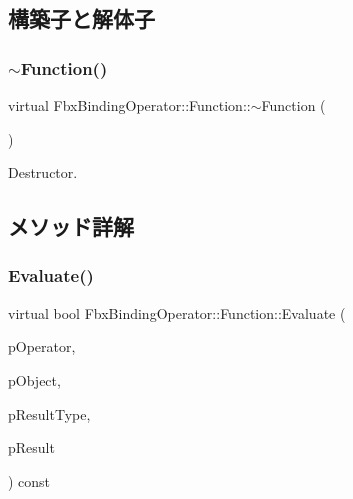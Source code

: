 \subsection{構築子と解体子}
\mbox{\label{class_fbx_binding_operator_1_1_function_a87c75b7d2a19945c11161104691294c9}} 
\subsubsection{\texorpdfstring{$\sim$\+Function()}{~Function()}}
{\footnotesize\ttfamily virtual Fbx\+Binding\+Operator\+::\+Function\+::$\sim$\+Function (\begin{DoxyParamCaption}{ }\end{DoxyParamCaption})\hspace{0.3cm}{\ttfamily [virtual]}}



Destructor. 



\subsection{メソッド詳解}
\mbox{\label{class_fbx_binding_operator_1_1_function_aa238a63d12508db3cb5c00a4b157524e}} 
\subsubsection{\texorpdfstring{Evaluate()}{Evaluate()}}
{\footnotesize\ttfamily virtual bool Fbx\+Binding\+Operator\+::\+Function\+::\+Evaluate (\begin{DoxyParamCaption}\item[{const \hyperlink{class_fbx_binding_operator}{Fbx\+Binding\+Operator} $\ast$}]{p\+Operator,  }\item[{const \hyperlink{class_fbx_object}{Fbx\+Object} $\ast$}]{p\+Object,  }\item[{\hyperlink{fbxpropertytypes_8h_a73913a5ddfb20e57c6f25e9e6784bd92}{E\+Fbx\+Type} $\ast$}]{p\+Result\+Type,  }\item[{void $\ast$$\ast$}]{p\+Result }\end{DoxyParamCaption}) const\hspace{0.3cm}{\ttfamily [pure virtual]}}

